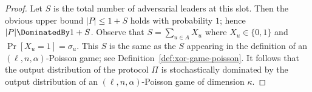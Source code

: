 \begin{proof}
		Let $S$ is the total number of adversarial leaders at this slot.
		Then the obvious upper bound $|P| \leq 1 + S$ holds with probability $1$; 
		hence $|P| \DominatedBy 1 + S$. 
		Observe that $S = \sum_{u \in A} X_u$ where $X_u \in \{0,1\}$ and $\Pr[X_u = 1] = \sigma_u$. 
		This $S$ is the same as the $S$ appearing in the definition  
		of an $(\ell, n, \alpha)$-Poisson game; see Definition~\ref{def:xor-game-poisson}.
		It follows that the 
		output distribution of the protocol $\Pi$
		is 
		stochastically dominated by the 
		output distribution of 
		an $(\ell, n, \alpha)$-Poisson game of dimension $\kappa$.
\end{proof}












